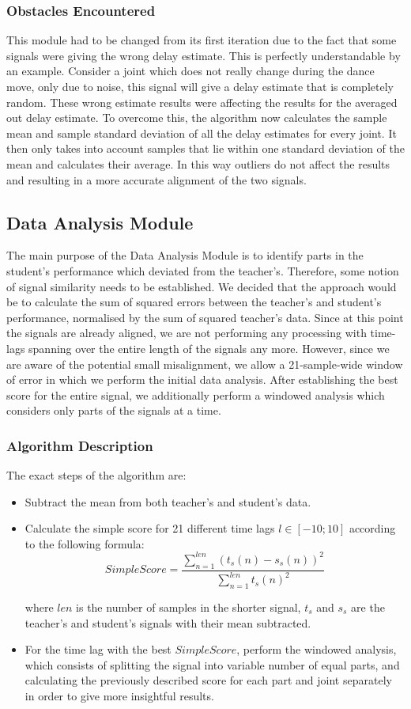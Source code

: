 \documentclass[a4paper]{article}
\begin{document}
\subsubsection{Obstacles Encountered}
\noindent
This module had to be changed from its first iteration due to the fact that some signals were giving the wrong delay estimate. This is perfectly understandable by an example. Consider a joint which does not really change during the dance move, only due to noise, this signal will give a delay estimate that is completely random. These wrong estimate results were affecting the results for the averaged out delay estimate. To overcome this, the algorithm now calculates the sample mean and sample standard deviation of all the delay estimates for every joint. It then only takes into account samples that lie within one standard deviation of the mean and calculates their average. In this way outliers do not affect the results and resulting in a more accurate alignment of the two signals.  

\subsection{Data Analysis Module}
\noindent
The main purpose of the Data Analysis Module is to identify parts in the student's performance which deviated from the teacher's. Therefore, some notion of signal similarity needs to be established. We decided that the approach would be to calculate the sum of squared errors  between the teacher's and student's performance, normalised by the sum of squared teacher's data. Since at this point the signals are already aligned, we are not performing any processing with time-lags spanning over the entire length of the signals any more. However, since we are aware of the potential small misalignment, we allow a 21-sample-wide window of error in which we perform the initial data analysis. After establishing the best score for the entire signal, we additionally perform a windowed analysis which considers only parts of the signals at a time.
\subsubsection{Algorithm Description}
\noindent
 The exact steps of the algorithm are:
\begin{itemize}
\setlength{\itemsep}{1pt}
\setlength{\parskip}{0pt}
\setlength{\parsep}{0pt}
	\item Subtract the mean from both teacher's and student's data.	
	\item Calculate the simple score for 21 different time lags $l \in [-10;10]$ according to the following formula:
	$$SimpleScore = \dfrac{\sum\limits_{n=1}^{len}(t_s(n)-s_s(n))^2}{\sum\limits_{n=1}^{len}t_s(n)^2}$$

	where $len$ is the number of samples in the shorter signal, $t_s$ and $s_s$ are the teacher's and student's signals with their mean subtracted.
	\item For the time lag with the best $SimpleScore$, perform the windowed analysis, which consists of splitting the signal into variable number of equal parts, and calculating the previously described score for each part and joint separately in order to give more insightful results.
\end{itemize}
\end{document}

